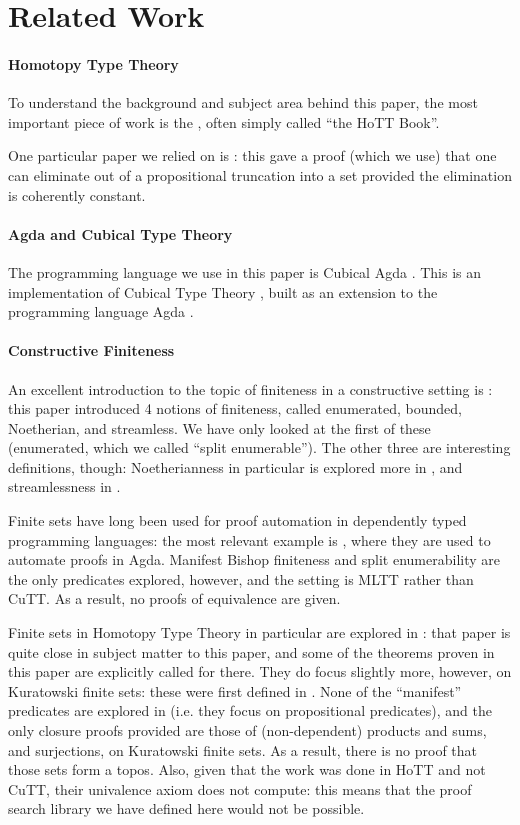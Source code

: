 \section{Related Work}
\paragraph{Homotopy Type Theory}
To understand the background and subject area behind this paper, the most
important piece of work is the \cite{hottbook}, often simply called ``the HoTT
Book''.

One particular paper we relied on is \cite{krausGeneralUniversalProperty2015}:
this gave a proof (which we use) that one can eliminate out of a propositional
truncation into a set provided the elimination is coherently constant.
\paragraph{Agda and Cubical Type Theory}
The programming language we use in this paper is Cubical Agda
\cite{vezzosiCubicalAgdaDependently2019}.
This is an implementation of Cubical Type Theory
\cite{cohenCubicalTypeTheory2016}, built as an extension to the programming
language Agda \cite{norellDependentlyTypedProgramming2008}.
\paragraph{Constructive Finiteness}
An excellent introduction to the topic of finiteness in a constructive setting
is \cite{coquandConstructivelyFinite2010}: this paper introduced 4 notions of
finiteness, called enumerated, bounded, Noetherian, and streamless.
We have only looked at the first of these (enumerated, which we called ``split
enumerable'').
The other three are interesting definitions, though: Noetherianness in
particular is explored more in \cite{firsovVariationsNoetherianness2016}, and
streamlessness in \cite{parmannInvestigatingStreamlessSets2015}.

Finite sets have long been used for proof automation in dependently typed
programming languages: the most relevant example is
\cite{firsovDependentlyTypedProgramming2015}, where they are used to automate
proofs in Agda.
Manifest Bishop finiteness and split enumerability are the only predicates
explored, however, and the setting is MLTT rather than CuTT.
As a result, no proofs of equivalence are given.

Finite sets in Homotopy Type Theory in particular are explored in
\cite{fruminFiniteSetsHomotopy2018}: that paper is quite close in subject
matter to this paper, and some of the theorems proven in this paper are
explicitly called for there.
They do focus slightly more, however, on Kuratowski finite sets: these were
first defined in \cite{kuratowskiNotionEnsembleFini1920}.
None of the ``manifest'' predicates are explored in
\cite{fruminFiniteSetsHomotopy2018} (i.e. they focus on propositional
predicates), and the only closure proofs provided are those of (non-dependent)
products and sums, and surjections, on Kuratowski finite sets.
As a result, there is no proof that those sets form a topos.
Also, given that the work was done in HoTT and not CuTT, their univalence axiom
does not compute: this means that the proof search library we have defined here
would not be possible.
